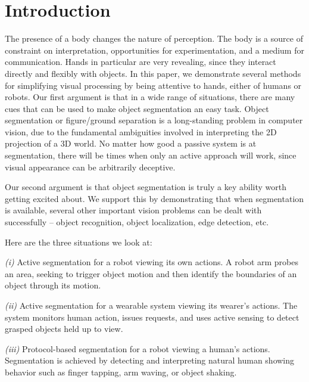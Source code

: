 

\section{Introduction}

The presence of a body changes the nature of perception.  
%
The body is a source of constraint on interpretation, opportunities for
experimentation, and a medium for communication.
%
Hands in particular are very revealing, since they interact directly
and flexibly with objects.  In this paper, we demonstrate several
methods for simplifying visual processing by being attentive
to hands, either of humans or robots.
%
Our first argument is that in a wide range of situations, there are
many cues that can be used to make object segmentation an easy task.
Object segmentation or figure/ground separation is a long-standing
problem in computer vision, due to the fundamental ambiguities
involved in interpreting the 2D projection of a 3D world.  No matter
how good a passive system is at segmentation, there will be times when
only an active approach will work, since visual appearance can be
arbitrarily deceptive.

Our second argument is that object segmentation is truly a key ability
worth getting excited about.  We support this by demonstrating that
when segmentation is available, several other important vision
problems can be dealt with successfully -- object recognition,
object localization, edge detection, etc.

Here are the three situations we look at:


      {\em (i)} 
      Active segmentation for a robot viewing its own actions.
      A robot arm
      probes an area, seeking to trigger object motion and then
      identify the boundaries of an object through its motion.

      {\em (ii)} 
      Active segmentation for a wearable system viewing its wearer's
      actions.  The system monitors human action, issues requests, and
      uses active sensing to detect grasped objects held up to view.

      {\em (iii)} 
      Protocol-based segmentation for a robot viewing a human's actions.
      Segmentation is achieved by detecting and interpreting 
      natural human showing behavior such as finger tapping, arm
      waving, or object shaking.


